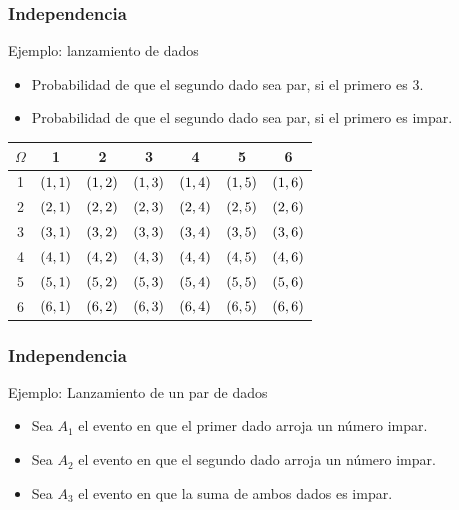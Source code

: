 \documentclass[table]{beamer}
\begin{document}
\begin{frame}
    \frametitle{Independencia}
    \begin{block}{Ejemplo: lanzamiento de dados}
        \begin{itemize}
            \item Probabilidad de que el segundo dado sea par, si el primero es 3.
            \item Probabilidad de que el segundo dado sea par, si el primero es impar.
        \end{itemize}
    \end{block}
    \begin{center}
        \begin{tabular}{c|cccccc}
            $\Omega$ & 1 & 2 & 3 & 4 & 5 & 6 \\
            \hline
            1 & $\parens{1, 1}$ & $\parens{1, 2}$ & $\parens{1, 3}$ & $\parens{1, 4}$ & $\parens{1, 5}$ & $\parens{1, 6}$ \\
            2 & $\parens{2, 1}$ & $\parens{2, 2}$ & $\parens{2, 3}$ & $\parens{2, 4}$ & $\parens{2, 5}$ & $\parens{2, 6}$ \\
            3 & $\parens{3, 1}$ & $\parens{3, 2}$ & $\parens{3, 3}$ & $\parens{3, 4}$ & $\parens{3, 5}$ & $\parens{3, 6}$ \\
            4 & $\parens{4, 1}$ & $\parens{4, 2}$ & $\parens{4, 3}$ & $\parens{4, 4}$ & $\parens{4, 5}$ & $\parens{4, 6}$ \\
            5 & $\parens{5, 1}$ & $\parens{5, 2}$ & $\parens{5, 3}$ & $\parens{5, 4}$ & $\parens{5, 5}$ & $\parens{5, 6}$ \\
            6 & $\parens{6, 1}$ & $\parens{6, 2}$ & $\parens{6, 3}$ & $\parens{6, 4}$ & $\parens{6, 5}$ & $\parens{6, 6}$ \\
        \end{tabular}
    \end{center}
\end{frame}

\begin{frame}
\frametitle{Independencia}
\begin{block}{Ejemplo: Lanzamiento de un par de dados}
    \begin{itemize}
        \item Sea $A_1$ el evento en que el primer dado arroja un número impar.
        \item Sea $A_2$ el evento en que el segundo dado arroja un número impar.
        \item Sea $A_3$ el evento en que la suma de ambos dados es impar.
    \end{itemize}
\end{block}
\end{frame}
\end{document}
